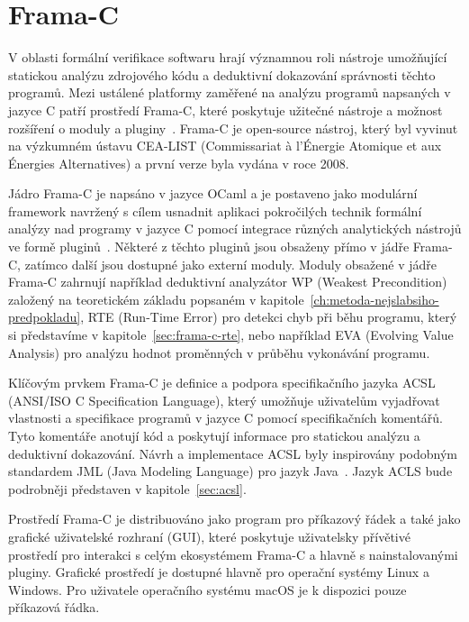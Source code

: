 \chapter{Frama-C}
\label{ch:frama-c}

V oblasti formální verifikace softwaru hrají významnou roli nástroje umožňující
statickou analýzu zdrojového kódu a deduktivní dokazování správnosti těchto programů.
Mezi ustálené platformy zaměřené na analýzu programů napsaných v jazyce C patří prostředí Frama\mbox{-}C,
které poskytuje užitečné nástroje a možnost rozšíření o moduly a pluginy~\cite{FCKernelMaroneze2024}.
Frama\mbox{-}C je open-source nástroj, který byl vyvinut na výzkumném ústavu CEA-LIST (Commissariat à l'Énergie Atomique et aux Énergies Alternatives)
a první verze byla vydána v roce 2008.

Jádro Frama\mbox{-}C je napsáno v jazyce OCaml a je postaveno jako modulární framework
navržený s cílem usnadnit aplikaci pokročilých technik formální analýzy nad programy v jazyce C
pomocí integrace různých analytických nástrojů ve formě pluginů~\cite{FCPluginDevSignoles2024}.
Některé z těchto pluginů jsou obsaženy přímo v jádře Frama\mbox{-}C, zatímco další jsou dostupné jako externí moduly.
Moduly obsažené v jádře Frama\mbox{-}C zahrnují například deduktivní analyzátor WP (Weakest Precondition)
založený na teoretickém základu popsaném v kapitole~\ref{ch:metoda-nejslabsiho-predpokladu},
RTE (Run-Time Error) pro detekci chyb při běhu programu, který si představíme v kapitole~\ref{sec:frama-c-rte},
nebo například EVA (Evolving Value Analysis) pro analýzu hodnot proměnných v průběhu vykonávání programu.

Klíčovým prvkem Frama\mbox{-}C je definice a podpora specifikačního jazyka ACSL (ANSI/ISO C Specification Language),
který umožňuje uživatelům vyjadřovat vlastnosti a specifikace programů v jazyce C pomocí specifikačních komentářů.
Tyto komentáře anotují kód a poskytují informace pro statickou analýzu a deduktivní dokazování.
Návrh a implementace ACSL byly inspirovány podobným standardem JML (Java Modeling Language) pro jazyk Java~\cite{ACSLSpec}.
Jazyk ACLS bude podrobněji představen v kapitole~\ref{sec:acsl}.

Prostředí Frama\mbox{-}C je distribuováno jako program pro příkazový řádek a také jako grafické uživatelské rozhraní (GUI),
které poskytuje uživatelsky přívětivé prostředí pro interakci s celým ekosystémem Frama\mbox{-}C a hlavně s nainstalovanými pluginy.
Grafické prostředí je dostupné hlavně pro operační systémy Linux a Windows.
Pro uživatele operačního systému macOS je k dispozici pouze příkazová řádka.

